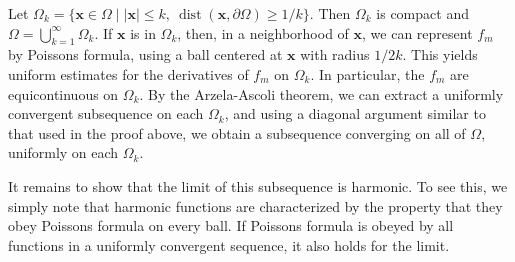 \begin{Proof}
Let $\Omega_k=\{\bm{x}\in\Omega\mid|\bm{x}|\leq k,\ \operatorname{dist}(\bm{x},\partial\Omega)\geq1/k\}$. Then $\Omega_k$ is compact and $\Omega=\bigcup_{k=1}^\infty\Omega_k$. If $\bm{x}$ is in $\Omega_k$, then, in a neighborhood of $\bm{x}$, we can represent $f_m$ by Poisson\textquotesingle s formula, using a ball centered at $\bm{x}$ with radius $1/2k$. This yields uniform estimates for the derivatives of $f_m$ on $\Omega_k$. In particular, the $f_m$ are equicontinuous on $\Omega_k$. By the Arzela-Ascoli theorem, we can extract a uniformly convergent subsequence on each $\Omega_k$, and using a diagonal argument similar to that used in the proof above, we obtain a subsequence converging on all of $\Omega$, uniformly on each $\Omega_k$.

It remains to show that the limit of this subsequence is harmonic. To see this, we simply note that harmonic functions are characterized by the property that they obey Poisson\textquotesingle s formula on every ball. If Poisson\textquotesingle s formula is obeyed by all functions in a uniformly convergent sequence, it also holds for the limit.
\end{Proof}
